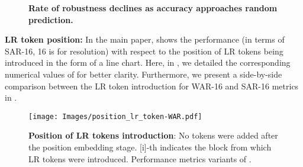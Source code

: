 \begin{figure}[!t]
\centering
{}
\caption{ 
\textbf{Rate of robustness declines as accuracy approaches random prediction.
}
}
\label{fig:alpha_hyperparam_supp}
\end{figure}



\noindent \textbf{LR token position:} In the main paper,  shows the performance (in terms of SAR-16, 16 is for resolution) with respect to the position of LR tokens being introduced in the form of a line chart. Here, in \textbf{}, we detailed the corresponding numerical values of  for better clarity.
Furthermore, we present a side-by-side comparison between the LR token introduction for WAR-16 and SAR-16 metrics in \textbf{}.





\begin{table}[!t]
\centering
\renewcommand{\arraystretch}{1.2}
\setlength\tabcolsep{2pt}
\centering
{}
\label{tab:pos_lr_tokens}  
\end{table}
\begin{figure}[!t]
\centering
{}
\hfill
\subfloat
{
\texttt{[image: Images/position\_lr\_token-WAR.pdf]}
}
\caption{ 
\textbf{Position of LR tokens introduction}: No tokens were added after the position embedding stage. [i]-th indicates the block from which LR tokens were introduced. Performance metrics variants of .
}
\label{fig:pos_lrtk_supp}
\end{figure}





